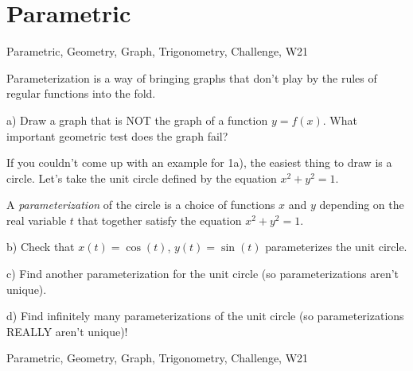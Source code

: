 \section{Parametric}

\begin{tagblock}{Parametric, Geometry, Graph, Trigonometry, Challenge, W21}
\begin{question}
Parameterization is a way of bringing graphs that don't play by the rules of regular functions into the fold. 

\bigskip

a) Draw a graph that is NOT the graph of a function $y=f(x)$. What important geometric test does the graph fail?

\bigskip

If you couldn't come up with an example for 1a), the easiest thing to draw is a circle. Let's take the unit circle defined by the equation $x^2+y^2=1$. 

A \textit{parameterization} of the circle is a choice of functions $x$ and $y$ depending on the real variable $t$ that together satisfy the equation $x^2+y^2=1$. 

\bigskip

b) Check that $x(t)=\cos(t)$, $y(t)=\sin(t)$ parameterizes the unit circle. 

\bigskip

c) Find another parameterization for the unit circle (so parameterizations aren't unique).

\bigskip

d) Find infinitely many parameterizations of the unit circle (so parameterizations REALLY aren't unique)!
	
	
\begin{tags}
	    Parametric, Geometry, Graph, Trigonometry, Challenge, W21
\end{tags}
	
\begin{diary}
\end{diary}
	
\begin{solution}
	   
\end{solution}
	
\end{question}

\end{tagblock}


